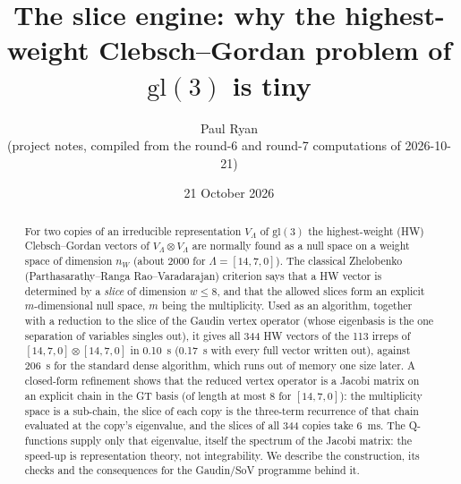 \documentclass[11pt]{article}
\title{\vspace{-1.6cm}The slice engine: why the highest-weight Clebsch--Gordan problem of $\mathrm{gl}(3)$ is tiny}
\author{Paul Ryan\\ \small (project notes, compiled from the round-6 and round-7 computations of 2026-10-21)}
\date{21 October 2026}
\makeatletter
\renewcommand\section{\@startsection{section}{1}{\z@}{-2.6ex \@plus -1ex \@minus -.2ex}{1.0ex \@plus .2ex}{\normalfont\large\bfseries}}
\makeatother
\begin{document}
\maketitle

\begin{abstract}
For two copies of an irreducible representation $V_\Lambda$ of $\mathrm{gl}(3)$ the highest-weight (HW) Clebsch--Gordan vectors of $V_\Lambda\otimes V_\Lambda$ are normally found as a null space on a weight space of dimension $n_W$ (about 2000 for $\Lambda=[14,7,0]$).
The classical Zhelobenko (Parthasarathy--Ranga Rao--Varadarajan) criterion says that a HW vector is determined by a \emph{slice} of dimension $w\le8$, and that the allowed slices form an explicit $m$-dimensional null space, $m$ being the multiplicity.
Used as an algorithm, together with a reduction to the slice of the Gaudin vertex operator (whose eigenbasis is the one separation of variables singles out), it gives all 344 HW vectors of the 113 irreps of $[14,7,0]\otimes[14,7,0]$ in 0.10~s (0.17~s with every full vector written out), against 206~s for the standard dense algorithm, which runs out of memory one size later.
A closed-form refinement shows that the reduced vertex operator is a Jacobi matrix on an explicit chain in the GT basis (of length at most 8 for $[14,7,0]$): the multiplicity space is a sub-chain, the slice of each copy is the three-term recurrence of that chain evaluated at the copy's eigenvalue, and the slices of all 344 copies take 6~ms.
The Q-functions supply only that eigenvalue, itself the spectrum of the Jacobi matrix: the speed-up is representation theory, not integrability.
We describe the construction, its checks and the consequences for the Gaudin/SoV programme behind it.
\end{abstract}

\section{Punchline}\label{sec:punch}
\end{document}
